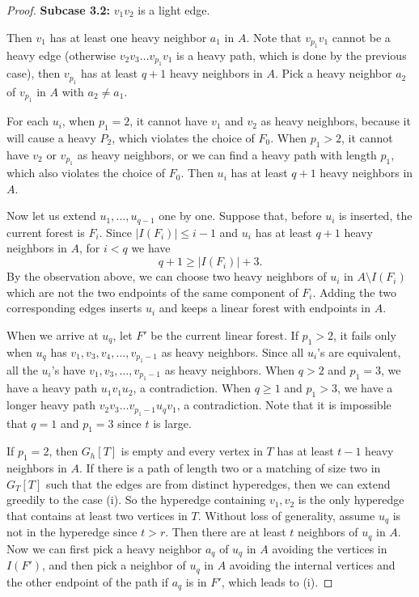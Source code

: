 \documentclass[10pt,a4paper]{amsart}
\begin{document}
\begin{proof}
    \textbf{Subcase 3.2:} $v_1v_2$ is a light edge.
    
    Then $v_1$ has at least one heavy neighbor $a_1$ in $A$.
    Note that $v_{p_1}v_1$ cannot be a heavy edge (otherwise $v_2v_3 \dots v_{p_1}v_1$ is a heavy path, which is done by the previous case), then $v_{p_1}$ has at least $q+1$ heavy neighbors in $A$.
    Pick a heavy neighbor $a_2$ of $v_{p_1}$ in $A$ with $a_2 \neq a_1$.

    For each $u_i$, when $p_1 = 2$, it cannot have $v_1$ and $v_2$ as heavy neighbors, because it will cause a heavy $P_2$, which violates the choice of $F_0$.
    When $p_1 > 2$, it cannot have $v_2$ or $v_{p_1}$ as heavy neighbors, or we can find a heavy path with length $p_1$, which also violates the choice of $F_0$.
    Then $u_i$ has at least $q+1$ heavy neighbors in $A$.

Now let us extend $u_1,\ldots,u_{q-1}$ one by one. Suppose that, before
$u_i$ is inserted, the current forest is $F_i$. Since
$|I(F_i)|\le i-1$ and $u_i$ has at least $q+1$ heavy neighbors in
$A$, for $i<q$ we have
$$
q+1 \ge |I(F_i)|+3 .
$$
By the observation above, we can choose two heavy neighbors of $u_i$ in
$A\setminus I(F_i)$ which are not the two endpoints of the same component
of $F_i$. Adding the two corresponding edges inserts $u_i$ and keeps a
linear forest with endpoints in $A$.
    
    

    When we arrive at $u_q$, let $F'$ be the current linear forest.
    If $p_1 > 2$, it fails only when $u_q$ has $v_1, v_3,v_4,\ldots, v_{p_1-1}$ as heavy neighbors.
    Since all $u_i$'s are equivalent, all the $u_i$'s have $v_1, v_3,\ldots, v_{p_1-1}$ as heavy neighbors.
    When $q > 2$ and $p_1 = 3$, we have a heavy path $u_1v_1u_2$, a contradiction.
    When $q \ge 1$ and $p_1 > 3$, we have a longer heavy path $v_2v_3\ldots v_{p_1-1}u_qv_1$, a contradiction.
    Note that it is impossible that $q = 1$ and $p_1 = 3$ since $t$ is large.

    If $p_1 = 2$, then $G_h[T]$ is empty and every vertex in $T$ has at least $t-1$ heavy neighbors in $A$.
    If there is a path of length two or a matching of size two in $G_T[T]$ such that the edges are from distinct hyperedges, then we can extend greedily to the case (i).
    So the hyperedge containing $v_1,v_2$ is the only hyperedge that contains at least two vertices in $T$.
    Without loss of generality, assume $u_q$ is not in the hyperedge since $t > r$.
    Then there are at least $t$ neighbors of $u_q$ in $A$.
    Now we can first pick a heavy neighbor $a_q$ of $u_q$ in $A$ avoiding the vertices in $I(F')$, and then pick a neighbor of $u_q$ in $A$ avoiding the internal vertices and the other endpoint of the path if $a_q$ is in $F'$, which leads to (i).



\end{proof}
\end{document}
